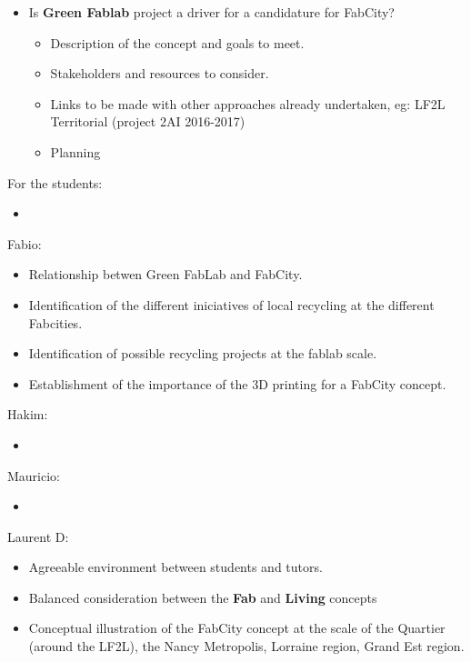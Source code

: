 \begin{tcolorbox}
\begin{itemize}
\begin{itemize}
			\end{itemize}
		
		\item Is \textbf{Green Fablab} project a driver for a candidature for FabCity?
			\begin{itemize}
				\item Description of the concept and goals to meet.
				\item Stakeholders and resources to consider.
				\item Links to be made with other approaches already undertaken, eg: LF2L Territorial (project 2AI 2016-2017)
				\item Planning
			\end{itemize}
				
	\end{itemize}

		
For the students:
		\begin{itemize}
			\item 
		\end{itemize}

Fabio:
	\begin{itemize}
		\item Relationship betwen Green FabLab and FabCity.
		\item Identification of the different iniciatives of local recycling at the different Fabcities.
		\item Identification of possible recycling projects at the fablab scale.
		\item Establishment of the importance of the 3D printing for a FabCity concept.
	\end{itemize}

Hakim:
\begin{itemize}
	\item 
\end{itemize}

Mauricio:
\begin{itemize}
	\item 
\end{itemize}

Laurent D:
\begin{itemize}
	\item  Agreeable environment between students and tutors.
	\item Balanced consideration  between the \textbf{Fab} and \textbf{Living} concepts
	\item Conceptual illustration of the FabCity concept at the scale of the Quartier (around the LF2L), the Nancy Metropolis, Lorraine region, Grand Est region.
	

\end{itemize}
\end{tcolorbox}
